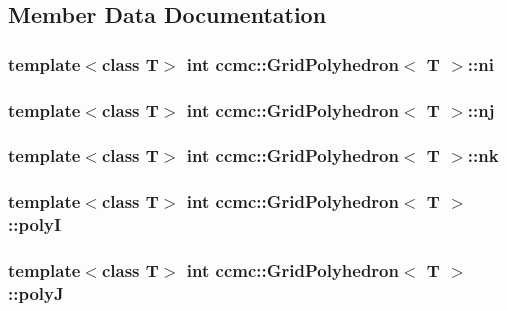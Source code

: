 \subsection{Member Data Documentation}
\hypertarget{classccmc_1_1_grid_polyhedron_aca37d584aa724d6c57cd9d678cda7f8e}{
\subsubsection[{ni}]{\setlength{\rightskip}{0pt plus 5cm}template$<$class T$>$ int {\bf ccmc\-::\-Grid\-Polyhedron}$<$ T $>$\-::ni}}\label{classccmc_1_1_grid_polyhedron_aca37d584aa724d6c57cd9d678cda7f8e}
\hypertarget{classccmc_1_1_grid_polyhedron_ad9d1803b57ac5fc5ef59ee79678e6ea6}{
\subsubsection[{nj}]{\setlength{\rightskip}{0pt plus 5cm}template$<$class T$>$ int {\bf ccmc\-::\-Grid\-Polyhedron}$<$ T $>$\-::nj}}\label{classccmc_1_1_grid_polyhedron_ad9d1803b57ac5fc5ef59ee79678e6ea6}
\hypertarget{classccmc_1_1_grid_polyhedron_a62664743e578a38fa6df7d2773c66d90}{
\subsubsection[{nk}]{\setlength{\rightskip}{0pt plus 5cm}template$<$class T$>$ int {\bf ccmc\-::\-Grid\-Polyhedron}$<$ T $>$\-::nk}}\label{classccmc_1_1_grid_polyhedron_a62664743e578a38fa6df7d2773c66d90}
\hypertarget{classccmc_1_1_grid_polyhedron_a4970eeb2a331105f03304e685f610881}{
\subsubsection[{poly\-I}]{\setlength{\rightskip}{0pt plus 5cm}template$<$class T$>$ int {\bf ccmc\-::\-Grid\-Polyhedron}$<$ T $>$\-::poly\-I}}\label{classccmc_1_1_grid_polyhedron_a4970eeb2a331105f03304e685f610881}
\hypertarget{classccmc_1_1_grid_polyhedron_a4e3afff489393e554662f62364795413}{
\subsubsection[{poly\-J}]{\setlength{\rightskip}{0pt plus 5cm}template$<$class T$>$ int {\bf ccmc\-::\-Grid\-Polyhedron}$<$ T $>$\-::poly\-J}}\label{classccmc_1_1_grid_polyhedron_a4e3afff489393e554662f62364795413}
